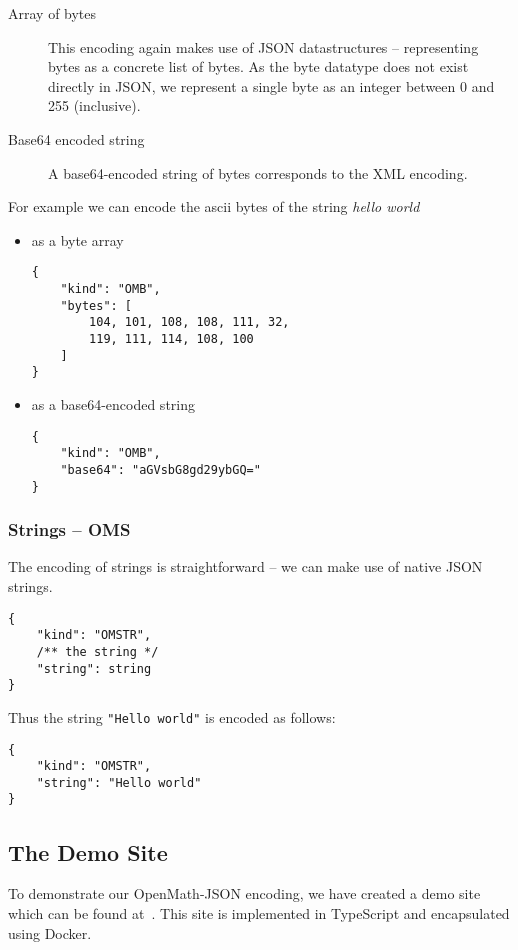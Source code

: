 \begin{description}
    \item[Array of bytes]
    This encoding again makes use of JSON datastructures -- representing bytes as a concrete list of bytes.
    As the byte datatype does not exist directly in JSON, we represent a single byte as an integer between 0 and 255 (inclusive). 

    \item[Base64 encoded string]
    A base64-encoded string of bytes corresponds to the XML encoding. 
\end{description}

For example we can encode the ascii bytes of the string \textit{hello world}
\begin{itemize}
    \item as a byte array
\begin{lstlisting}
{
    "kind": "OMB",
    "bytes": [
        104, 101, 108, 108, 111, 32, 
        119, 111, 114, 108, 100
    ]
}
\end{lstlisting}
    \item as a base64-encoded string
\begin{lstlisting}
{
    "kind": "OMB",
    "base64": "aGVsbG8gd29ybGQ="
}
\end{lstlisting}
\end{itemize}

\subsubsection{Strings -- OMS}
The encoding of strings is straightforward -- we can make use of native JSON strings. 
\begin{lstlisting}
{
    "kind": "OMSTR", 
    /** the string */
    "string": string
}
\end{lstlisting}

Thus the string \lstinline{"Hello world"} is encoded as follows:
\begin{lstlisting}
{
    "kind": "OMSTR", 
    "string": "Hello world"
}
\end{lstlisting}




\subsection{The Demo Site}

To demonstrate our OpenMath-JSON encoding, we have created a demo site which can be found at~\cite{openmathjson:web}. 
This site is implemented in TypeScript and encapsulated using Docker\cite{docker:webpage}. 

